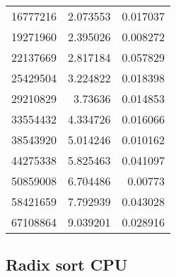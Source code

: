 \begin{longtable}{r r r}
16777216 & 2.073553 & 0.017037 \\
19271960 & 2.395026 & 0.008272 \\
22137669 & 2.817184 & 0.057829 \\
25429504 & 3.224822 & 0.018398 \\
29210829 & 3.73636 & 0.014853 \\
33554432 & 4.334726 & 0.016066 \\
38543920 & 5.014246 & 0.010162 \\
44275338 & 5.825463 & 0.041097 \\
50859008 & 6.704486 & 0.00773 \\
58421659 & 7.792939 & 0.043028 \\
67108864 & 9.039201 & 0.028916 \\
\end{longtable}

\subsection*{Radix sort CPU}

